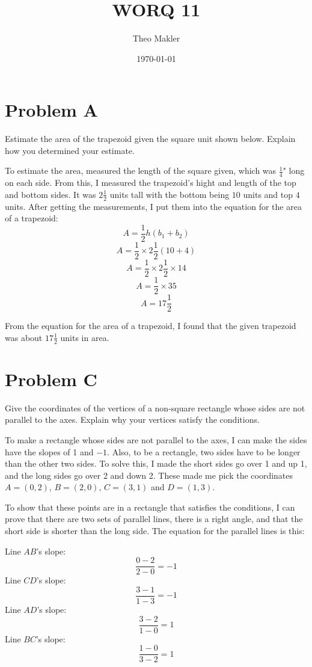 \documentclass[a4paper]{article}
\title{WORQ 11}
\author{Theo Makler}
\date{\today}
\begin{document}
\maketitle

\section{Problem A}

Estimate the area of the trapezoid given the square unit shown below. Explain how you determined your estimate.

To estimate the area,  measured the length of the square given, which was $\frac{1}{4}$" long on each side. From this, I measured the trapezoid's hight and length of the top and bottom sides. It was $2\frac{1}{2}$ units tall with the bottom being $10$ units and top $4$ units. After getting the measurements, I put them into the equation for the area of a trapezoid:
$$A=\frac{1}{2}h(b_{1}+b_{2})$$
$$A=\frac{1}{2}\times2\frac{1}{2}(10+4)$$
$$A=\frac{1}{2}\times2\frac{1}{2}\times14$$
$$A=\frac{1}{2}\times35$$
$$A=17\frac{1}{2}$$

From the equation for the area of a trapezoid, I found that the given trapezoid was about $17\frac{1}{2}$ units in area.

\section{Problem C}

Give the coordinates of the vertices of a non-square rectangle whose sides are not parallel to the axes. Explain why your vertices satisfy the conditions.

To make a rectangle whose sides are not parallel to the axes, I can make the sides have the slopes of 1 and $-1$. Also, to be a rectangle, two sides have to be longer than the other two sides. To solve this, I made the short sides go over 1 and up 1, and the long sides go over 2 and down 2. These made me pick the coordinates $A=(0,2)$, $B=(2,0)$, $C=(3,1)$ and $D=(1,3)$.

To show that these points are in a rectangle that satisfies the conditions, I can prove that there are two sets of parallel lines, there is a right angle, and that the short side is shorter than the long side. The equation for the parallel lines is this:

Line $AB$'s slope:
$$\frac{0-2}{2-0}=-1$$
Line $CD$'s slope:
$$\frac{3-1}{1-3}=-1$$
Line $AD$'s slope:
$$\frac{3-2}{1-0}=1$$
Line $BC$'s slope:
$$\frac{1-0}{3-2}=1$$
\end{document}

